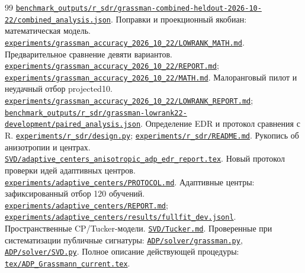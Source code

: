 \documentclass[11pt,a4paper]{article}
\numberwithin{equation}{section}
\newcommand{\repo}[1]{\href{../#1}{\nolinkurl{#1}}}
\begin{document}
\begin{thebibliography}{99}
\repo{benchmark_outputs/r_sdr/grassman-combined-heldout-2026-10-22/combined_analysis.json}.
 Поправки и проекционный якобиан: математическая модель.
\repo{experiments/grassman_accuracy_2026_10_22/LOWRANK_MATH.md}.
 Предварительное сравнение девяти вариантов.
\repo{experiments/grassman_accuracy_2026_10_22/REPORT.md};
\repo{experiments/grassman_accuracy_2026_10_22/MATH.md}.
 Малоранговый пилот и неудачный отбор projected10.
\repo{experiments/grassman_accuracy_2026_10_22/LOWRANK_REPORT.md};
\repo{benchmark_outputs/r_sdr/grassman-lowrank22-development/paired_analysis.json}.
 Определение EDR и протокол сравнения с R.
\repo{experiments/r_sdr/design.py}; \repo{experiments/r_sdr/README.md}.
 Рукопись об анизотропии и центрах.
\repo{SVD/adaptive_centers_anisotropic_adp_edr_report.tex}.
 Новый протокол проверки идей адаптивных центров.
\repo{experiments/adaptive_centers/PROTOCOL.md}.
 Адаптивные центры: зафиксированный отбор 120 обучений.
\repo{experiments/adaptive_centers/REPORT.md};
\repo{experiments/adaptive_centers/results/fullfit_dev.jsonl}.
 Пространственные CP/Tucker-модели.
\repo{SVD/Tucker.md}.
 Проверенные при систематизации публичные сигнатуры:
\repo{ADP/solver/grassman.py}, \repo{ADP/solver/SVD.py}.
Полное описание действующей процедуры:
\repo{tex/ADP_Grassmann_current.tex}.
\end{thebibliography}
\end{document}
